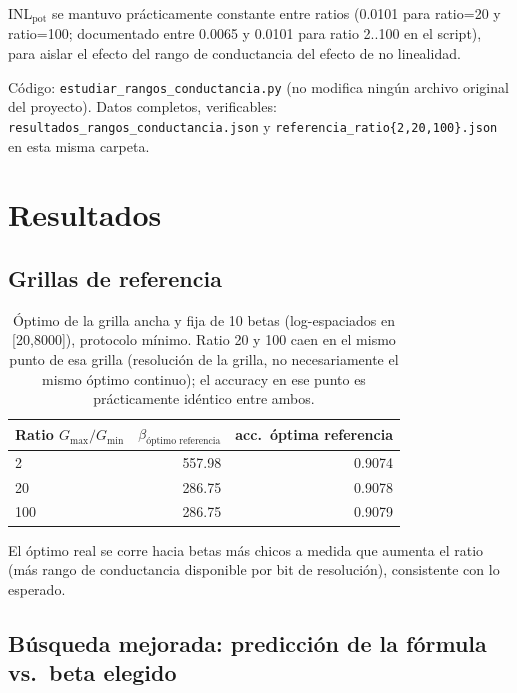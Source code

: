 \documentclass[11pt]{article}
\begin{document}
INL$_{\text{pot}}$ se mantuvo prácticamente constante entre ratios (0.0101 para ratio=20 y
ratio=100; documentado entre 0.0065 y 0.0101 para ratio 2..100 en el script), para aislar el
efecto del rango de conductancia del efecto de no linealidad.

Código: \texttt{estudiar\_rangos\_conductancia.py} (no modifica ningún archivo original del
proyecto). Datos completos, verificables: \texttt{resultados\_rangos\_conductancia.json} y
\texttt{referencia\_ratio\{2,20,100\}.json} en esta misma carpeta.

\section{Resultados}

\subsection{Grillas de referencia}

\begin{table}[htbp]
\centering
\begin{tabular}{@{}lrr@{}}
\toprule
Ratio $G_{\max}/G_{\min}$ & $\beta_{\text{óptimo referencia}}$ & acc.\ óptima referencia \\
\midrule
2   & 557.98 & 0.9074 \\
20  & 286.75 & 0.9078 \\
100 & 286.75 & 0.9079 \\
\bottomrule
\end{tabular}
\caption{Óptimo de la grilla ancha y fija de 10 betas (log-espaciados en [20,8000]), protocolo
mínimo. Ratio 20 y 100 caen en el mismo punto de esa grilla (resolución de la grilla, no
necesariamente el mismo óptimo continuo); el accuracy en ese punto es prácticamente idéntico
entre ambos.}
\end{table}

El óptimo real se corre hacia betas más chicos a medida que aumenta el ratio (más rango de
conductancia disponible por bit de resolución), consistente con lo esperado.

\subsection{Búsqueda mejorada: predicción de la fórmula vs.\ beta elegido}
\end{document}
